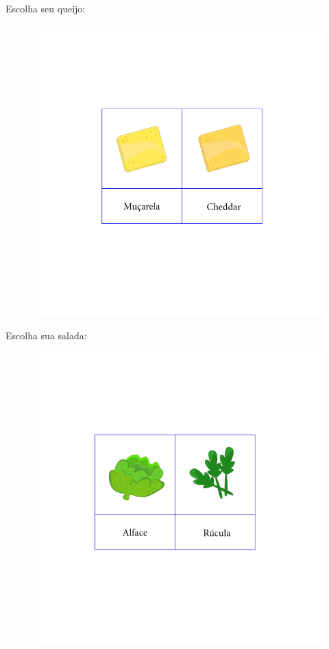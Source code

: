 Escolha seu queijo:

\begin{figure}[htpb!]
\includegraphics[width=\textwidth]{../ilustracoes/MAT5/SAEB_5ANO_MAT_figura81c.png}
\end{figure}

Escolha sua salada:

\begin{figure}[htpb!]
\includegraphics[width=\textwidth]{../ilustracoes/MAT5/SAEB_5ANO_MAT_figura81d.png}
\end{figure}

